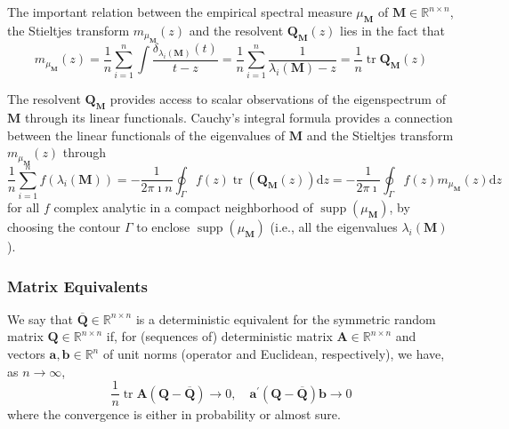 \begin{remark}
    The important relation between the empirical spectral measure $\mu_{\mathbf{M}}$ of $\mathbf{M}\in\mathbb{R}^{n\times n}$, the Stieltjes transform $m_{\mu_{\mathbf{M}}}(z)$ and the resolvent $\mathbf{Q}_{\mathbf{M}}(z)$ lies in the fact that
    \begin{equation} \label{eq:relation-between-empirical-spectral-measures-stieltjes-transform-and-its-resolvent}
        m_{\mu_{\mathbf{M}}}(z)=\frac{1}{n}\sum_{i=1}^{n}\int\frac{\delta_{\lambda_{i}(\mathbf{M})}(t)}{t-z}=\frac{1}{n}\sum_{i=1}^{n}\frac{1}{\lambda_{i}(\mathbf{M})-z}=\frac{1}{n}\operatorname{tr}\mathbf{Q}_{\mathbf{M}}(z)
    \end{equation}
\end{remark}


The resolvent $\mathbf{Q}_{\mathbf{M}}$ provides access to scalar observations of the eigenspectrum of $\mathbf{M}$ through its linear functionals. Cauchy’s integral formula provides a connection between the linear functionals of the eigenvalues of $\mathbf{M}$ and the Stieltjes transform $m_{\mu_{\mathbf{M}}}(z)$ through
\begin{equation}
    \frac{1}{n}\sum_{i=1}^{n}f\left(\lambda_{i}(\mathbf{M})\right)=-\frac{1}{2\pi\imath n}\oint_{\Gamma}f(z)\operatorname{tr}\left(\mathbf{Q}_{\mathbf{M}}(z)\right)\mathrm{d}z=-\frac{1}{2\pi\imath }\oint_{\Gamma}f(z)m_{\mu_{\mathbf{M}}}(z)\mathrm{d}z
\end{equation}
for all $f$ complex analytic in a compact neighborhood of $\operatorname{supp}\left(\mu_{\mathbf{M}}\right)$, by choosing the contour $\Gamma$ to enclose $\operatorname{supp}\left(\mu_{\mathbf{M}}\right)$ (i.e., all the eigenvalues $\lambda_{i}(\mathbf{M})$).

\subsubsection{Matrix Equivalents}

\begin{definition}
    We say that $\overline{\mathbf{Q}} \in \mathbb{R}^{n \times n}$ is a deterministic equivalent for the symmetric random matrix $\mathbf{Q} \in \mathbb{R}^{n \times n}$ if, for (sequences of) deterministic matrix $\mathbf{A} \in \mathbb{R}^{n \times n}$ and vectors $\mathbf{a}, \mathbf{b} \in \mathbb{R}^{n}$ of unit norms (operator and Euclidean, respectively), we have, as $n \rightarrow \infty$,
    $$
        \frac{1}{n} \operatorname{tr} \mathbf{A}(\mathbf{Q}-\overline{\mathbf{Q}}) \rightarrow 0, \quad \mathbf{a}^{\prime}(\mathbf{Q}-\overline{\mathbf{Q}}) \mathbf{b} \rightarrow 0
    $$
    where the convergence is either in probability or almost sure.
\end{definition}

